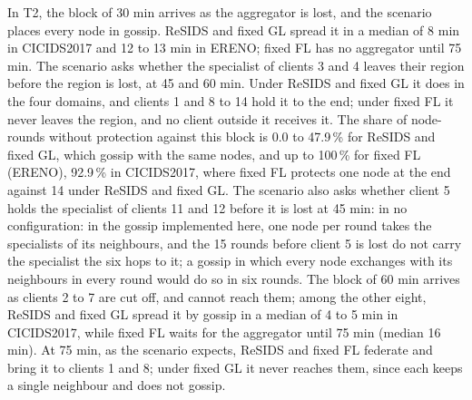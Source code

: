 In T2, the block of 30 min arrives as the aggregator is lost, and the scenario places every node in gossip. ReSIDS and fixed GL spread it in a median of 8 min in CICIDS2017 and 12 to 13 min in ERENO; fixed FL has no aggregator until 75 min. The scenario asks whether the specialist of clients 3 and 4 leaves their region before the region is lost, at 45 and 60 min. Under ReSIDS and fixed GL it does in the four domains, and clients 1 and 8 to 14 hold it to the end; under fixed FL it never leaves the region, and no client outside it receives it. The share of node-rounds without protection against this block is 0.0 to 47.9\,\% for ReSIDS and fixed GL, which gossip with the same nodes, and up to 100\,\% for fixed FL (ERENO), 92.9\,\% in CICIDS2017, where fixed FL protects one node at the end against 14 under ReSIDS and fixed GL. The scenario also asks whether client 5 holds the specialist of clients 11 and 12 before it is lost at 45 min: in no configuration: in the gossip implemented here, one node per round takes the specialists of its neighbours, and the 15 rounds before client 5 is lost do not carry the specialist the six hops to it; a gossip in which every node exchanges with its neighbours in every round would do so in six rounds. The block of 60 min arrives as clients 2 to 7 are cut off, and cannot reach them; among the other eight, ReSIDS and fixed GL spread it by gossip in a median of 4 to 5 min in CICIDS2017, while fixed FL waits for the aggregator until 75 min (median 16 min). At 75 min, as the scenario expects, ReSIDS and fixed FL federate and bring it to clients 1 and 8; under fixed GL it never reaches them, since each keeps a single neighbour and does not gossip.

